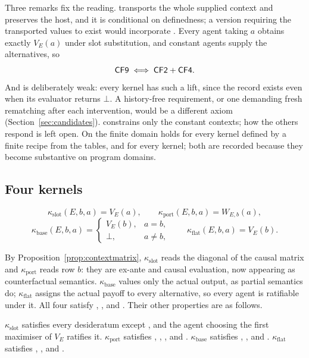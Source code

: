 Three remarks fix the reading.  transports the whole supplied context and preserves the
host, and it is conditional on definedness; a version requiring the transported values to exist
would incorporate . Every agent taking $a$ obtains exactly $V_E(a)$ under slot substitution,
and constant agents supply the alternatives, so
\[
  \textup{\textsf{CF9}}\iff\textup{\textsf{CF2}}+\textup{\textsf{CF4}}.
\]
And  is deliberately weak: every kernel has such a lift, since the record exists even when its
evaluator returns $\bot$. A history-free requirement, or one demanding fresh rematching after each
intervention, would be a different axiom (Section~\ref{sec:candidates}).  constrains only the
constant contexts; how the others respond is left open. On the finite domain  holds for every
kernel defined by a finite recipe from the tables, and  for every kernel; both are recorded
because they become substantive on program domains.

\subsection{Four kernels}

\begin{definition}
\[
  \kappa_{\mathrm{slot}}(E,b,a)=V_E(a),\qquad
  \kappa_{\mathrm{port}}(E,b,a)=W_{E,b}(a),
\]
\[
  \kappa_{\mathrm{base}}(E,b,a)=\begin{cases}V_E(b),&a=b,\\\bot,&a\ne b,\end{cases}\qquad
  \kappa_{\mathrm{flat}}(E,b,a)=V_E(b).
\]
\end{definition}

By Proposition~\ref{prop:contextmatrix}, $\kappa_{\mathrm{slot}}$ reads the diagonal of the causal
matrix and $\kappa_{\mathrm{port}}$ reads row $b$: they are ex-ante and causal evaluation, now
appearing as counterfactual semantics. $\kappa_{\mathrm{base}}$ values only the actual output, as
partial semantics do; $\kappa_{\mathrm{flat}}$ assigns the actual payoff to every alternative, so
every agent is ratifiable under it. All four satisfy , , and . Their other
properties are as follows.

\begin{lemma}\label{lem:witnesses}
$\kappa_{\mathrm{slot}}$ satisfies every desideratum except , and the agent choosing the first
maximiser of $V_E$ ratifies it. $\kappa_{\mathrm{port}}$ satisfies , , , and
. $\kappa_{\mathrm{base}}$ satisfies , , and . $\kappa_{\mathrm{flat}}$
satisfies , , and .
\end{lemma}


